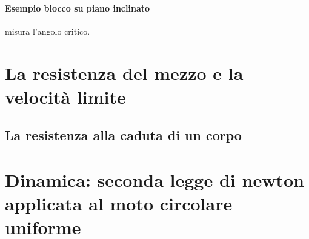 \documentclass[12pt, a4paper, openany]{book}
\begin{document}
\paragraph*{Esempio blocco su piano inclinato} misura l'angolo critico.

\section*{La resistenza del mezzo e la velocità limite}
\subsection*{La resistenza alla caduta di un corpo}

\section*{Dinamica: seconda legge di newton applicata al moto circolare uniforme}
\end{document}
